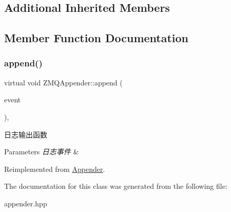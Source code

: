 \subsection*{Additional Inherited Members}


\subsection{Member Function Documentation}
\mbox{\label{classZMQAppender_a318ff01f9c6c8fbe93da0d0598aadab9}} 
\subsubsection{\texorpdfstring{append()}{append()}}
{\footnotesize\ttfamily virtual void Z\+M\+Q\+Appender\+::append (\begin{DoxyParamCaption}\item[{Log\+Event\+::sptr}]{event }\end{DoxyParamCaption})\hspace{0.3cm}{\ttfamily [override]}, {\ttfamily [virtual]}}



日志输出函数 


\begin{DoxyParams}{Parameters}
{\em 日志事件} & \\
\hline
\end{DoxyParams}


Reimplemented from \hyperlink{classAppender_a3bfa17781e5b6102667725a5d23b394a}{Appender}.



The documentation for this class was generated from the following file\+:\begin{DoxyCompactItemize}
\item 
appender.\+hpp\end{DoxyCompactItemize}
